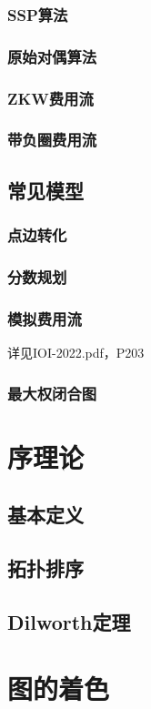 \documentclass[12pt,a4paper]{article}
\begin{document}
\subsubsection{SSP算法}
\subsubsection{原始对偶算法} %
\subsubsection{ZKW费用流}
\subsubsection{带负圈费用流}
\subsection{常见模型}
\subsubsection{点边转化}
\subsubsection{分数规划}
\subsubsection{模拟费用流}
详见IOI-2022.pdf，P203

\subsubsection{最大权闭合图}

\newpage
\section{序理论}
\subsection{基本定义}
\subsection{拓扑排序}
\subsection{Dilworth定理}

\newpage
\section{图的着色}
\end{document}
